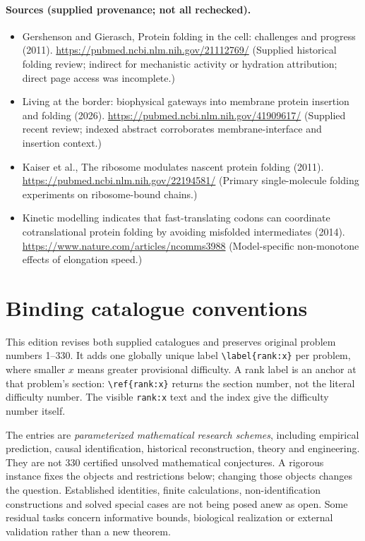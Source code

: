 \documentclass[11pt]{article}
\begin{document}
\paragraph{Sources (supplied provenance; not all rechecked).}
\begin{itemize}
\item Gershenson and Gierasch, Protein folding in the cell: challenges and progress (2011). \url{https://pubmed.ncbi.nlm.nih.gov/21112769/} (Supplied historical folding review; indirect for mechanistic activity or hydration attribution; direct page access was incomplete.)
\item Living at the border: biophysical gateways into membrane protein insertion and folding (2026). \url{https://pubmed.ncbi.nlm.nih.gov/41909617/} (Supplied recent review; indexed abstract corroborates membrane-interface and insertion context.)
\item Kaiser et al., The ribosome modulates nascent protein folding (2011). \url{https://pubmed.ncbi.nlm.nih.gov/22194581/} (Primary single-molecule folding experiments on ribosome-bound chains.)
\item Kinetic modelling indicates that fast-translating codons can coordinate cotranslational protein folding by avoiding misfolded intermediates (2014). \url{https://www.nature.com/articles/ncomms3988} (Model-specific non-monotone effects of elongation speed.)
\end{itemize}


\section*{Binding catalogue conventions}
This edition revises both supplied catalogues and preserves original problem numbers 1--330. It adds one globally unique label \verb|\label{rank:x}| per problem, where smaller $x$ means greater provisional difficulty. A rank label is an anchor at that problem's section: \verb|\ref{rank:x}| returns the section number, not the literal difficulty number. The visible \texttt{rank:x} text and the index give the difficulty number itself.

The entries are \emph{parameterized mathematical research schemes}, including empirical prediction, causal identification, historical reconstruction, theory and engineering. They are not 330 certified unsolved mathematical conjectures. A rigorous instance fixes the objects and restrictions below; changing those objects changes the question. Established identities, finite calculations, non-identification constructions and solved special cases are not being posed anew as open. Some residual tasks concern informative bounds, biological realization or external validation rather than a new theorem.
\end{document}
